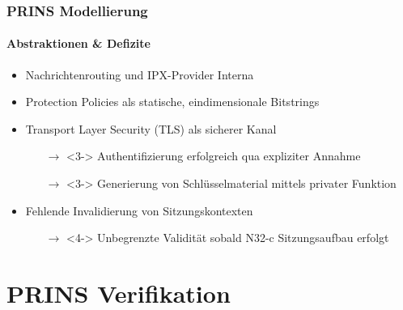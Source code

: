 \documentclass{beamer}
\begin{document}
\begin{frame}
    \frametitle{PRINS Modellierung}
    \framesubtitle{Abstraktionen \& Defizite}

    \begin{itemize}
        \item<1-> Nachrichtenrouting und IPX-Provider Interna
        \vspace*{2mm}
        \item<2-> Protection Policies als statische, eindimensionale Bitstrings
        \vspace*{2mm}
        \item<3-> Transport Layer Security (TLS) als sicherer Kanal
        \begin{itemize}
            \item[$\rightarrow$]<3-> Authentifizierung erfolgreich qua expliziter Annahme
            \item[$\rightarrow$]<3-> Generierung von Schlüsselmaterial mittels privater Funktion
        \end{itemize}
        \vspace*{2mm}
        \item<4-> Fehlende Invalidierung von Sitzungskontexten
        \begin{itemize}
            \item[$\rightarrow$]<4-> Unbegrenzte Validität sobald N32-c Sitzungsaufbau erfolgt
        \end{itemize}
    \end{itemize}
\end{frame}

\section{PRINS Verifikation}
\end{document}
